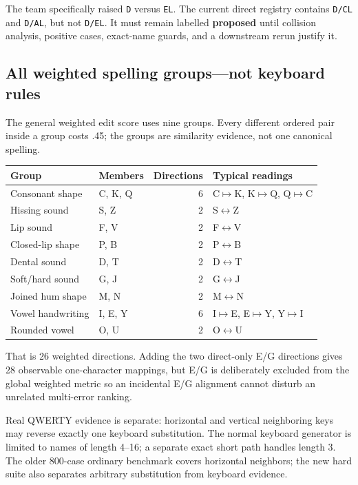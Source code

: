 \documentclass[10pt,a4paper]{article}
\newcommand{\observed}[1]{\texttt{#1}}
\begin{document}
\begin{proposedbox}[title=D / EL is not an implemented rule]
The team specifically raised \observed{D} versus \observed{EL}. The current
direct registry contains \observed{D/CL} and \observed{D/AL}, but not
\observed{D/EL}. It must remain labelled \textbf{proposed} until collision
analysis, positive cases, exact-name guards, and a downstream rerun justify it.
\end{proposedbox}

\subsection{All weighted spelling groups---not keyboard rules}

The general weighted edit score uses nine groups. Every different ordered
pair inside a group costs .45; the groups are similarity evidence, not one
canonical spelling.

\begin{tabularx}{\textwidth}{@{}L{27mm}L{28mm}rY@{}}
\toprule
Group & Members & Directions & Typical readings \\
\midrule
Consonant shape & C, K, Q & 6 & C$\mapsto$K, K$\mapsto$Q, Q$\mapsto$C \\
Hissing sound & S, Z & 2 & S$\leftrightarrow$Z \\
Lip sound & F, V & 2 & F$\leftrightarrow$V \\
Closed-lip shape & P, B & 2 & P$\leftrightarrow$B \\
Dental sound & D, T & 2 & D$\leftrightarrow$T \\
Soft/hard sound & G, J & 2 & G$\leftrightarrow$J \\
Joined hum shape & M, N & 2 & M$\leftrightarrow$N \\
Vowel handwriting & I, E, Y & 6 & I$\mapsto$E, E$\mapsto$Y, Y$\mapsto$I \\
Rounded vowel & O, U & 2 & O$\leftrightarrow$U \\
\bottomrule
\end{tabularx}

That is 26 weighted directions. Adding the two direct-only E/G directions
gives 28 observable one-character mappings, but E/G is deliberately excluded
from the global weighted metric so an incidental E/G alignment cannot disturb
an unrelated multi-error ranking.

Real QWERTY evidence is separate: horizontal and vertical neighboring keys
may reverse exactly one keyboard substitution. The normal keyboard generator
is limited to names of length 4--16; a separate exact short path handles
length 3. The older 800-case ordinary benchmark covers horizontal neighbors;
the new hard suite also separates arbitrary substitution from keyboard evidence.
\end{document}
